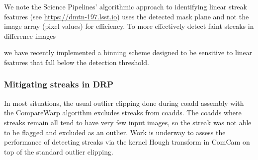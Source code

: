 We note the Science Pipelines' algorithmic approach to identifying linear streak features  (see
\url{https://dmtn-197.lsst.io}) uses the detected mask plane and not the image array (pixel values) for
efficiency. To more effectively detect faint streaks in difference images

we have recently implemented a binning scheme designed to be sensitive to linear features that fall below the detection threshold.

\subsubsection{Mitigating streaks in DRP}

In most situations, the usual outlier clipping done during coadd assembly with the CompareWarp algorithm excludes streaks from coadds. The coadds where streaks remain all tend to have very few input images, so the streak was not able to be flagged and excluded as an outlier. Work is underway to assess the performance of detecting streaks via the kernel Hough transform in ComCam on top of the standard outlier clipping.

